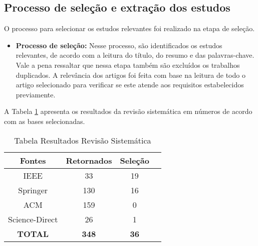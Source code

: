 \subsection{Processo de seleção e extração dos estudos}

O processo para selecionar os estudos relevantes foi realizado na etapa de seleção.

\begin{itemize}
    \item \textbf{Processo de seleção:} Nesse processo, são identificados os estudos relevantes, de
acordo com a leitura do título, do resumo e das palavras-chave. Vale a pena ressaltar
que nessa etapa também são excluídos os trabalhos duplicados. A relevância dos artigos foi feita com base na
leitura de todo o artigo selecionado para verificar se este atende aos requisitos estabelecidos previamente.
 
\end{itemize}

A Tabela \ref{tab:resultados} apresenta os resultados da revisão sistemática em números de acordo com as bases selecionadas. 

\begin{table}[htbp]
\centering
\caption{Tabela Resultados Revisão Sistemática}
\label{tab:resultados}
\begin{tabular}{|c|c|c|c|}
\hline
\textbf{Fontes} & \textbf{Retornados} & \textbf{Seleção} \\ \hline
IEEE & 33 &  19  \\ \hline
Springer & 130 &  16  \\ \hline
ACM & 159 &  0  \\ \hline
Science-Direct & 26 & 1  \\ \hline
\textbf{TOTAL} & \textbf{348} & \textbf{36} \\ \hline
\end{tabular}
\end{table}
